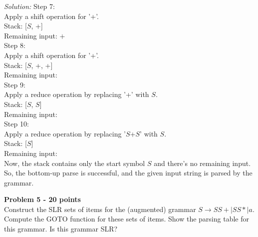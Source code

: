 \documentclass[a4paper, 11pt]{article}
\newenvironment{problem}[2][Problem]
    { \begin{mdframed}[backgroundcolor=gray!20] \textbf{#1 #2} \\}
    {  \end{mdframed}}
\newenvironment{solution}
    {\textit{Solution:}}
    {}
\begin{document}
\begin{solution}
\noindent Step 7:\\
\quad Apply a shift operation for '+'.\\
\quad Stack: [$S$, +]\\
\quad Remaining input: $+$ \\

\noindent Step 8:\\
\quad Apply a shift operation for '+'.\\
\quad Stack: [$S$, +, +]\\
\quad Remaining input:  \\

\noindent Step 9:\\
\quad Apply a reduce operation by replacing '+' with $S$.\\
\quad Stack: [$S$, $S$]\\
\quad Remaining input:  \\

\noindent Step 10:\\
\quad Apply a reduce operation by replacing '$S$+$S$' with $S$.\\
\quad Stack: [$S$]\\
\quad Remaining input:  \\

\noindent Now, the stack contains only the start symbol $S$ and there's no remaining input. So, the bottom-up parse is successful, and the given input string is parsed by the grammar.
\end{solution}


\begin{problem}{5 - 20 points}
Construct the SLR sets of items for the (augmented) grammar $S  \longrightarrow SS+ | SS* | a $. Compute the GOTO function for these sets of items. Show the parsing table for this grammar. Is this grammar SLR?

\end{problem}
\end{document}
